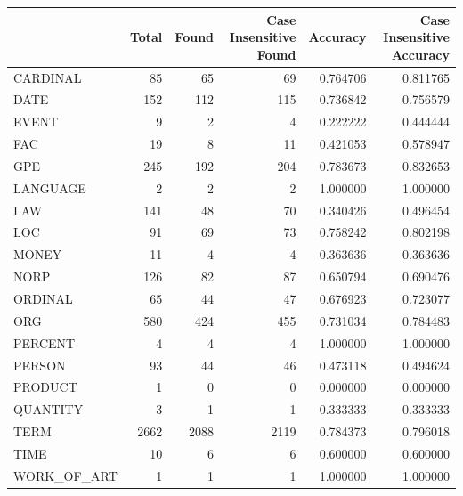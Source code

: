 \begin{tabular}{lrrrrr}
\toprule
 & Total & Found & Case Insensitive Found & Accuracy & Case Insensitive Accuracy \\
\midrule
CARDINAL & 85 & 65 & 69 & 0.764706 & 0.811765 \\
DATE & 152 & 112 & 115 & 0.736842 & 0.756579 \\
EVENT & 9 & 2 & 4 & 0.222222 & 0.444444 \\
FAC & 19 & 8 & 11 & 0.421053 & 0.578947 \\
GPE & 245 & 192 & 204 & 0.783673 & 0.832653 \\
LANGUAGE & 2 & 2 & 2 & 1.000000 & 1.000000 \\
LAW & 141 & 48 & 70 & 0.340426 & 0.496454 \\
LOC & 91 & 69 & 73 & 0.758242 & 0.802198 \\
MONEY & 11 & 4 & 4 & 0.363636 & 0.363636 \\
NORP & 126 & 82 & 87 & 0.650794 & 0.690476 \\
ORDINAL & 65 & 44 & 47 & 0.676923 & 0.723077 \\
ORG & 580 & 424 & 455 & 0.731034 & 0.784483 \\
PERCENT & 4 & 4 & 4 & 1.000000 & 1.000000 \\
PERSON & 93 & 44 & 46 & 0.473118 & 0.494624 \\
PRODUCT & 1 & 0 & 0 & 0.000000 & 0.000000 \\
QUANTITY & 3 & 1 & 1 & 0.333333 & 0.333333 \\
TERM & 2662 & 2088 & 2119 & 0.784373 & 0.796018 \\
TIME & 10 & 6 & 6 & 0.600000 & 0.600000 \\
WORK_OF_ART & 1 & 1 & 1 & 1.000000 & 1.000000 \\
\bottomrule
\end{tabular}
